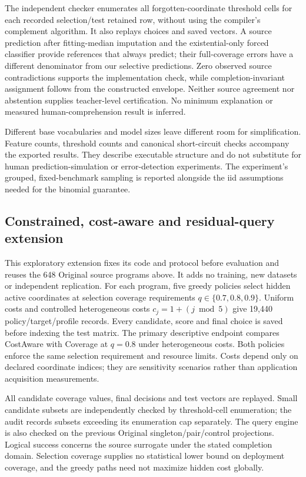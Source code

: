 \documentclass[review,12pt]{elsarticle}
\begin{document}
The independent checker enumerates all forgotten-coordinate threshold cells for each recorded selection/test retained row, without using the compiler's complement algorithm. It also replays choices and saved vectors. A source prediction after fitting-median imputation and the existential-only forced classifier provide references that always predict; their full-coverage errors have a different denominator from our selective predictions. Zero observed source contradictions supports the implementation check, while completion-invariant assignment follows from the constructed envelope. Neither source agreement nor abstention supplies teacher-level certification. No minimum explanation or measured human-comprehension result is inferred.

Different base vocabularies and model sizes leave different room for simplification. Feature counts, threshold counts and canonical short-circuit checks accompany the exported results. They describe executable structure and do not substitute for human prediction-simulation or error-detection experiments. The experiment's grouped, fixed-benchmark sampling is reported alongside the iid assumptions needed for the binomial guarantee.

\subsection{Constrained, cost-aware and residual-query extension}\label{sec:contextual-results}
This exploratory extension fixes its code and protocol before evaluation and reuses the 648 Original source programs above. It adds no training, new datasets or independent replication. For each program, five greedy policies select hidden active coordinates at selection coverage requirements $q\in\{0.7,0.8,0.9\}$. Uniform costs and controlled heterogeneous costs $c_j=1+(j\bmod5)$ give 19,440 policy/target/profile records. Every candidate, score and final choice is saved before indexing the test matrix. The primary descriptive endpoint compares CostAware with Coverage at $q=0.8$ under heterogeneous costs. Both policies enforce the same selection requirement and resource limits. Costs depend only on declared coordinate indices; they are sensitivity scenarios rather than application acquisition measurements.



All candidate coverage values, final decisions and test vectors are replayed. Small candidate subsets are independently checked by threshold-cell enumeration; the audit records subsets exceeding its enumeration cap separately. The query engine is also checked on the previous Original singleton/pair/control projections. Logical success concerns the source surrogate under the stated completion domain. Selection coverage supplies no statistical lower bound on deployment coverage, and the greedy paths need not maximize hidden cost globally.
\end{document}
